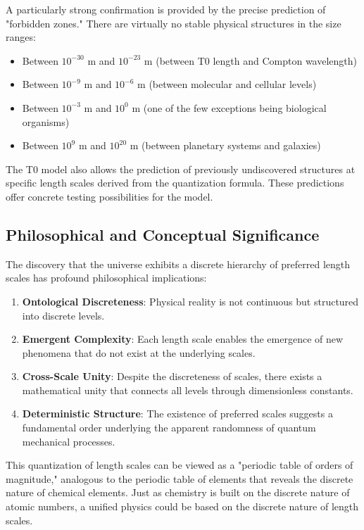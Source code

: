 \documentclass[12pt,a4paper]{article}
\begin{document}
A particularly strong confirmation is provided by the precise prediction of "forbidden zones." There are virtually no stable physical structures in the size ranges:

\begin{itemize}
	\item Between $10^{-30}$ m and $10^{-23}$ m (between T0 length and Compton wavelength)
	\item Between $10^{-9}$ m and $10^{-6}$ m (between molecular and cellular levels)
	\item Between $10^{-3}$ m and $10^{0}$ m (one of the few exceptions being biological organisms)
	\item Between $10^{9}$ m and $10^{20}$ m (between planetary systems and galaxies)
\end{itemize}

The T0 model also allows the prediction of previously undiscovered structures at specific length scales derived from the quantization formula. These predictions offer concrete testing possibilities for the model.

\subsection{Philosophical and Conceptual Significance}

The discovery that the universe exhibits a discrete hierarchy of preferred length scales has profound philosophical implications:

\begin{enumerate}
	\item \textbf{Ontological Discreteness}: Physical reality is not continuous but structured into discrete levels.
	
	\item \textbf{Emergent Complexity}: Each length scale enables the emergence of new phenomena that do not exist at the underlying scales.
	
	\item \textbf{Cross-Scale Unity}: Despite the discreteness of scales, there exists a mathematical unity that connects all levels through dimensionless constants.
	
	\item \textbf{Deterministic Structure}: The existence of preferred scales suggests a fundamental order underlying the apparent randomness of quantum mechanical processes.
\end{enumerate}

This quantization of length scales can be viewed as a "periodic table of orders of magnitude," analogous to the periodic table of elements that reveals the discrete nature of chemical elements. Just as chemistry is built on the discrete nature of atomic numbers, a unified physics could be based on the discrete nature of length scales.
\end{document}
